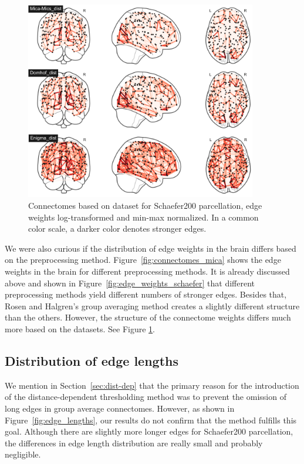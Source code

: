\begin{figure}
\begin{center}
    \includegraphics[width=0.9\textwidth]{images/manually_created/datasets.png}
  \end{center}
  \caption[Connectomes based on dataset]{Connectomes based on dataset for Schaefer200 parcellation, edge weights log-transformed and min-max normalized. In a common color scale, a darker color denotes stronger edges.}
  \label{fig:connectomes_by_dataset}
\end{figure}

We were also curious if the distribution of edge weights in the brain differs based on the preprocessing method. Figure~\ref{fig:connectomes_mica} shows the edge weights in the brain for different preprocessing methods. It is already discussed above and shown in Figure~\ref{fig:edge_weights_schaefer} that different preprocessing methods yield different numbers of stronger edges. Besides that, Rosen and Halgren's group averaging method creates a slightly different structure than the others. However, the structure of the connectome weights differs much more based on the datasets. See Figure \ref{fig:connectomes_by_dataset}. 

\subsection{Distribution of edge lengths}

We mention in Section~\ref{sec:dist-dep} that the primary reason for the introduction of the distance-dependent thresholding method was to prevent the omission of long edges in group average connectomes. However, as shown in Figure~\ref{fig:edge_lengths}, our results do not confirm that the method fulfills this goal. Although there are slightly more longer edges for Schaefer200 parcellation, the differences in edge length distribution are really small and probably negligible. 


